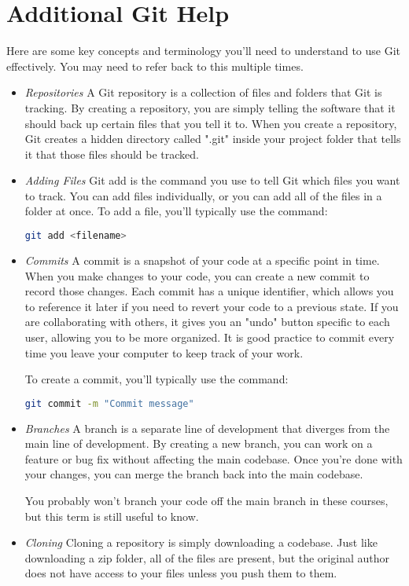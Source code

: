 \section{Additional Git Help}
\noindent Here are some key concepts and terminology you'll need to understand to use Git effectively.
\noindent You may need to refer back to this multiple times.
\begin{itemize}
\item \emph{Repositories}
A Git repository is a collection of files and folders that Git is tracking. 
By creating a repository, you are simply telling the software that it should back up certain files that you tell it to.
When you create a repository, Git creates a hidden directory called ".git" inside your project folder that tells it that those files should be tracked.

\item \emph{Adding Files}
Git add is the command you use to tell Git which files you want to track.
You can add files individually, or you can add all of the files in a folder at once.
To add a file, you'll typically use the command:
\begin{lstlisting}[language=bash]
git add <filename>
\end{lstlisting}

\item \emph{Commits}
A commit is a snapshot of your code at a specific point in time. 
When you make changes to your code, you can create a new commit to record those changes. 
Each commit has a unique identifier, which allows you to reference it later if you need to revert your code to a previous state.
If you are collaborating with others, it gives you an "undo" button specific to each user, allowing you to be more organized.
It is good practice to commit every time you leave your computer to keep track of your work.

To create a commit, you'll typically use the command:
\begin{lstlisting}[language=bash]
git commit -m "Commit message"
\end{lstlisting}

\item \emph{Branches}
A branch is a separate line of development that diverges from the main line of development. 
By creating a new branch, you can work on a feature or bug fix without affecting the main codebase. 
Once you're done with your changes, you can merge the branch back into the main codebase.

You probably won't branch your code off the main branch in these courses, but this term is still useful to know.
\item \emph{Cloning}
Cloning a repository is simply downloading a codebase.
Just like downloading a zip folder, all of the files are present, but the original author does not have access to your files unless you push them to them.


\end{itemize}
